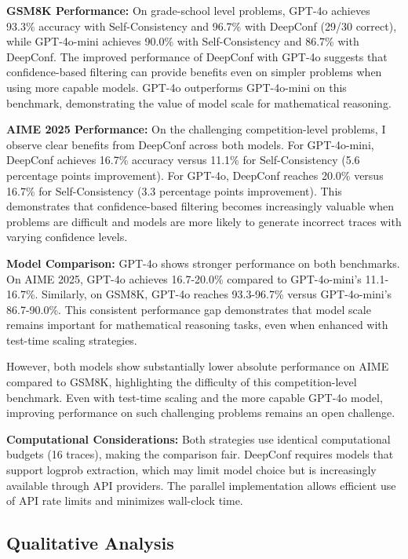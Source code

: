 \documentclass[11pt]{article}
\begin{document}
\textbf{GSM8K Performance:} On grade-school level problems, GPT-4o achieves 93.3\% accuracy with Self-Consistency and 96.7\% with DeepConf (29/30 correct), while GPT-4o-mini achieves 90.0\% with Self-Consistency and 86.7\% with DeepConf. The improved performance of DeepConf with GPT-4o suggests that confidence-based filtering can provide benefits even on simpler problems when using more capable models. GPT-4o outperforms GPT-4o-mini on this benchmark, demonstrating the value of model scale for mathematical reasoning.

\textbf{AIME 2025 Performance:} On the challenging competition-level problems, I observe clear benefits from DeepConf across both models. For GPT-4o-mini, DeepConf achieves 16.7\% accuracy versus 11.1\% for Self-Consistency (5.6 percentage points improvement). For GPT-4o, DeepConf reaches 20.0\% versus 16.7\% for Self-Consistency (3.3 percentage points improvement). This demonstrates that confidence-based filtering becomes increasingly valuable when problems are difficult and models are more likely to generate incorrect traces with varying confidence levels.

\textbf{Model Comparison:} GPT-4o shows stronger performance on both benchmarks. On AIME 2025, GPT-4o achieves 16.7-20.0\% compared to GPT-4o-mini's 11.1-16.7\%. Similarly, on GSM8K, GPT-4o reaches 93.3-96.7\% versus GPT-4o-mini's 86.7-90.0\%. This consistent performance gap demonstrates that model scale remains important for mathematical reasoning tasks, even when enhanced with test-time scaling strategies.

However, both models show substantially lower absolute performance on AIME compared to GSM8K, highlighting the difficulty of this competition-level benchmark. Even with test-time scaling and the more capable GPT-4o model, improving performance on such challenging problems remains an open challenge.

\textbf{Computational Considerations:} Both strategies use identical computational budgets (16 traces), making the comparison fair. DeepConf requires models that support logprob extraction, which may limit model choice but is increasingly available through API providers. The parallel implementation allows efficient use of API rate limits and minimizes wall-clock time.

\subsection{Qualitative Analysis}
\end{document}
